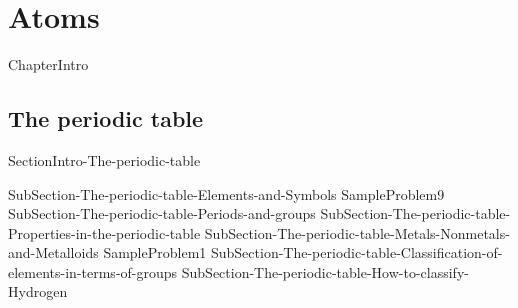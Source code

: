 \documentclass[main.tex]{subfiles}
\newcommand\chapterlabel{Ch-Table}\setcounter{figurenewcounter}{0}\setcounter{tablenewcounter}{0}\setcounter{formulanewcounter}{0}
\begin{document}
 \setcounter{chapter}{2}\chapter[Atoms]{Atoms} %

 
 
\begin{marginfigure}
      \texttt{[image: ../\{\\chapterlabel]}/figure1}
   \end{marginfigure}
   
 {ChapterIntro}

\section{The periodic table}{SectionIntro-The-periodic-table}
\sloppy\begin{description}
{SubSection-The-periodic-table-Elements-and-Symbols}
{SampleProblem9}
{SubSection-The-periodic-table-Periods-and-groups}
{SubSection-The-periodic-table-Properties-in-the-periodic-table}
{SubSection-The-periodic-table-Metals-Nonmetals-and-Metalloids}
{SampleProblem1}
{SubSection-The-periodic-table-Classification-of-elements-in-terms-of-groups}
{SubSection-The-periodic-table-How-to-classify-Hydrogen}
 \hspace{0cm}{Figure-The-periodic-table}
 \end{description}
 
\end{document}
